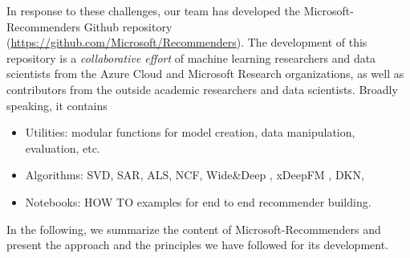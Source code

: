 In response to these challenges, our team has developed the Microsoft-Recommenders
Github repository (\url{https://github.com/Microsoft/Recommenders}).
The development of this repository is a {\em collaborative effort} of machine learning researchers and data scientists from the 
Azure Cloud and Microsoft Research organizations, as well as contributors from the outside academic researchers and data scientists.
Broadly speaking, it contains 
\begin{itemize}
\item
Utilities: modular functions for model creation, data manipulation, evaluation, etc.
\item
Algorithms: SVD, SAR, ALS, NCF, Wide\&Deep , xDeepFM , DKN,
\item
Notebooks: HOW TO examples for end to end recommender building.
\end{itemize}

In the following, we summarize the content of Microsoft-Recommenders and present the approach and the principles we have followed
for its development.
